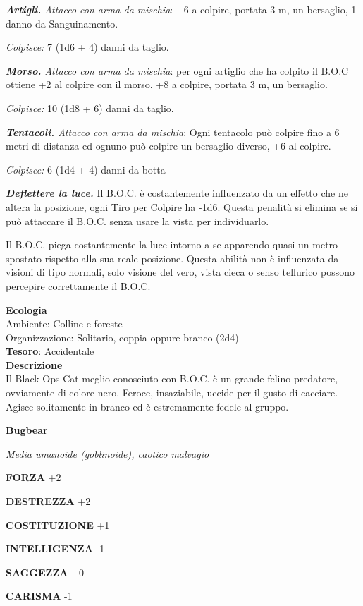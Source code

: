 \begin{multicols}{2}
\textit{\textbf{Artigli.} Attacco con arma da mischia}: +6 a colpire, portata 3 m, un bersaglio, 1 danno da Sanguinamento.

\textit{Colpisce:} 7 (1d6 + 4) danni da taglio.

\textit{\textbf{Morso.} Attacco con arma da mischia}: per ogni artiglio che ha colpito il B.O.C ottiene +2 al colpire con il morso. +8 a colpire, portata 3 m, un bersaglio.

\textit{Colpisce:} 10 (1d8 + 6) danni da taglio.

\textit{\textbf{Tentacoli.} Attacco con arma da mischia}: Ogni tentacolo può colpire fino a 6 metri di distanza ed ognuno può colpire un bersaglio diverso, +6 al colpire.

\textit{Colpisce:} 6 (1d4 + 4) danni da botta

\textit{\textbf{Deflettere la luce.}} Il B.O.C. è costantemente influenzato da un effetto che ne altera la posizione, ogni Tiro per Colpire ha -1d6. Questa penalità si elimina se si può attaccare il B.O.C. senza usare la vista per individuarlo.

Il B.O.C. piega costantemente la luce intorno a se apparendo quasi un metro spostato rispetto alla sua reale posizione. Questa abilità non è influenzata da visioni di tipo normali, solo visione del vero, vista cieca o senso tellurico possono percepire correttamente il B.O.C.

\textbf{Ecologia}\\
Ambiente: Colline e foreste\\
Organizzazione: Solitario, coppia oppure branco (2d4)\\
\textbf{Tesoro}: Accidentale\\
\textbf{Descrizione}\\
Il Black Ops Cat meglio conosciuto con B.O.C. è un grande felino predatore, ovviamente di colore nero. Feroce, insaziabile, uccide per il gusto di cacciare. Agisce solitamente in branco ed è estremamente fedele al gruppo.

\medskip{}\textbf{Bugbear}

\textit{Media umanoide (goblinoide), caotico malvagio}

\textbf{FORZA} +2

\textbf{DESTREZZA} +2

\textbf{COSTITUZIONE} +1

\textbf{INTELLIGENZA} -1

\textbf{SAGGEZZA} +0

\textbf{CARISMA} -1


\end{multicols}
